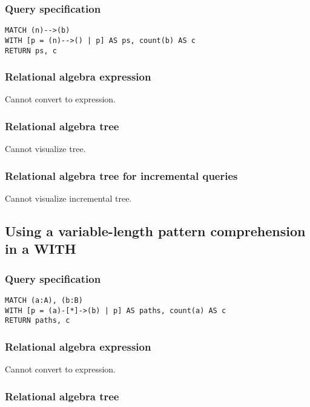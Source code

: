 \subsubsection*{Query specification}

\begin{lstlisting}
MATCH (n)-->(b)
WITH [p = (n)-->() | p] AS ps, count(b) AS c
RETURN ps, c
\end{lstlisting}

\subsubsection*{Relational algebra expression}

Cannot convert to expression.

\subsubsection*{Relational algebra tree}

Cannot visualize tree.

\subsubsection*{Relational algebra tree for incremental queries}

Cannot visualize incremental tree.

\subsection{Using a variable-length pattern comprehension in a WITH}

\subsubsection*{Query specification}

\begin{lstlisting}
MATCH (a:A), (b:B)
WITH [p = (a)-[*]->(b) | p] AS paths, count(a) AS c
RETURN paths, c
\end{lstlisting}

\subsubsection*{Relational algebra expression}

Cannot convert to expression.

\subsubsection*{Relational algebra tree}

